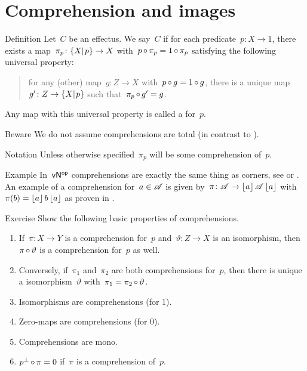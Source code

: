 \documentclass[b]{subfiles}
\begin{document}
\section{Comprehension and images}
\begin{parsec}%
\begin{point}{Definition}%
Let~$C$ be an effectus.
We say~$C$ 
    if for each predicate~$p \colon X \to 1$,
    there exists a map~$\pi_p \colon \{X|{\kern.2ex}p\} \to X$
    with~$p \mathop{\circ} \pi_p = 1 \mathop{\circ} \pi_p$
    satisfying the following universal property:
\begin{quote}
    for any (other) map~$g\colon Z \to X$
        with~$p \mathop{\circ} g = 1 \mathop{\circ} g$,
        there is a unique map~$g' \colon Z \to \{X|{\kern.2ex}p\}$
        such that~$\pi_p \mathop{\circ} g' = g$.
\end{quote}
Any  map with this universal property
    is called a  for~$p$.
\begin{point}{Beware}%
    We do not assume comprehensions are total
    (in contrast to \cite{effintro}).
\end{point}
\begin{point}{Notation}%
Unless otherwise specified~$\pi_p$ will be some
    comprehension of~$p$.
\end{point}
\end{point}
\begin{point}{Example}%
In~${\mathsf{vN}}{^{\mathsf{op}}}$ comprehensions are exactly the same thing
    as corners, see  or .
An example of a comprehension for~$a \in \mathscr{A}$
    is given by~$\pi\colon \mathscr{A} \to \left\lfloor a\right\rfloor\mathscr{A}\left\lfloor a\right\rfloor$
    with~$\pi(b) = \left\lfloor a\right\rfloor b\left\lfloor a\right\rfloor$
    as proven in .
\end{point}
\begin{point}{Exercise}%
Show the following basic properties of comprehensions.
\begin{enumerate}
    \item If~$\pi\colon X \to Y$ is a comprehension for~$p$
                and~$\vartheta\colon Z \to X$ is an isomorphism,
                then~$\pi \mathop{\circ} \vartheta$ is a comprehension for~$p$
                as well.
    \item Conversely, if~$\pi_1$ and~$\pi_2$
            are both comprehensions for~$p$,
            then there is unique a isomorphism~$\vartheta$
            with~$\pi_1 = \pi_2 \mathop{\circ} \vartheta$.
    \item Isomorphisms are comprehensions (for 1).
    \item Zero-maps are comprehensions (for 0).
    \item Comprehensions are mono.
    \item $p^\perp \mathop{\circ} \pi = 0$ if~$\pi$ is a comprehension of~$p$.
\end{enumerate}
\end{point}
\end{parsec}
\end{document}
